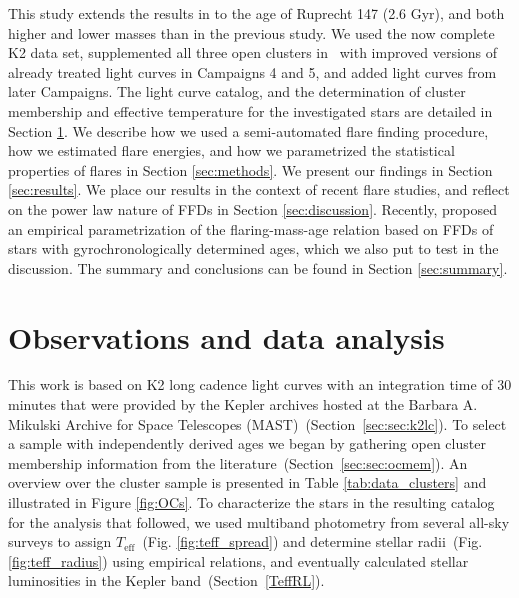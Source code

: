 \documentclass{aa}
\begin{document}
This study extends the results in  to the age of Ruprecht 147 (2.6 Gyr), and both higher and lower masses than in the previous study. We used the now complete K2 data set, supplemented all three open clusters in~ with improved versions of already treated light curves in Campaigns 4 and 5, and added light curves from later Campaigns. The light curve catalog, and the determination of cluster membership and effective temperature for the investigated stars are detailed in Section \ref{sec:data}. We describe how we used a semi-automated flare finding procedure, how we estimated flare energies, and how we parametrized the statistical properties of flares in Section \ref{sec:methods}. We present our findings in Section \ref{sec:results}. We place our results in the context of recent flare studies, and reflect on the power law nature of FFDs in Section \ref{sec:discussion}. Recently, \citet{davenport2019} proposed an empirical parametrization of the flaring-mass-age relation based on FFDs of stars with gyrochronologically determined ages, which we also put to test in the discussion. The summary and conclusions can be found in Section \ref{sec:summary}.
\section{Observations and data analysis}
\label{sec:data}
This work is based on K2 long cadence light curves with an integration time of 30 minutes that were provided by the Kepler archives hosted at the Barbara A. Mikulski Archive for Space Telescopes (MAST)~(Section~\ref{sec:sec:k2lc}). To select a sample with independently derived ages we began by gathering open cluster membership information from the literature~(Section~\ref{sec:sec:ocmem}). An overview over the cluster sample is presented in Table \ref{tab:data_clusters} and illustrated in Figure \ref{fig:OCs}. To characterize the stars in the resulting catalog for the analysis that followed, we used multiband photometry from several all-sky surveys to assign $T_\mathrm{eff}$~(Fig. \ref{fig:teff_spread}) and determine stellar radii~(Fig. \ref{fig:teff_radius}) using empirical relations, and eventually calculated stellar luminosities in the Kepler band~(Section~\ref{TeffRL}).
\end{document}
